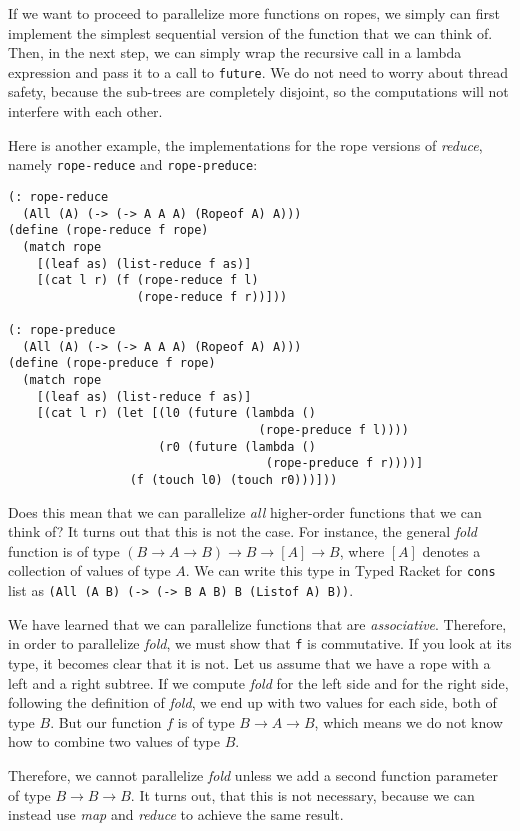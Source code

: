 \documentclass{article}
\begin{document}
If we want to proceed to parallelize more functions on ropes, we simply can first implement the simplest sequential version of the function that we can think of. Then, in the next step, we can simply wrap the recursive call in a lambda expression and pass it to a call to \lstinline{future}. We do not need to worry about thread safety, because the sub-trees are completely disjoint, so the computations will not interfere with each other.

Here is another example, the implementations for the rope versions of \emph{reduce}, namely \lstinline{rope-reduce} and \lstinline{rope-preduce}:

\begin{lstlisting}
(: rope-reduce
  (All (A) (-> (-> A A A) (Ropeof A) A)))
(define (rope-reduce f rope)
  (match rope
    [(leaf as) (list-reduce f as)]
    [(cat l r) (f (rope-reduce f l)
                  (rope-reduce f r))]))

(: rope-preduce
  (All (A) (-> (-> A A A) (Ropeof A) A)))
(define (rope-preduce f rope)
  (match rope
    [(leaf as) (list-reduce f as)]
    [(cat l r) (let [(l0 (future (lambda ()
                                   (rope-preduce f l))))
                     (r0 (future (lambda ()
                                    (rope-preduce f r))))]
                 (f (touch l0) (touch r0)))]))
\end{lstlisting}

Does this mean that we can parallelize \emph{all} higher-order functions that we can think of? It turns out that this is not the case. For instance, the general \emph{fold} function is of type $(B \rightarrow A \rightarrow B) \rightarrow B \rightarrow [A] \rightarrow B$, where $[A]$ denotes a collection of values of type $A$. We can write this type in Typed Racket for \lstinline{cons} list as \lstinline{(All (A B) (-> (-> B A B) B (Listof A) B))}.

We have learned that we can parallelize functions that are \emph{associative}. Therefore, in order to parallelize \emph{fold}, we must show that \lstinline{f} is commutative. If you look at its type, it becomes clear that it is not. Let us assume that we have a rope with a left and a right subtree. If we compute \emph{fold} for the left side and for the right side, following the definition of \emph{fold}, we end up with two values for each side, both of type $B$. But our function $f$ is of type $B \rightarrow A \rightarrow B$, which means we do not know how to combine two values of type $B$.

Therefore, we cannot parallelize \emph{fold} unless we add a second function parameter of type $B \rightarrow B \rightarrow B$. It turns out, that this is not necessary, because we can instead use \emph{map} and \emph{reduce} to achieve the same result.
\end{document}

